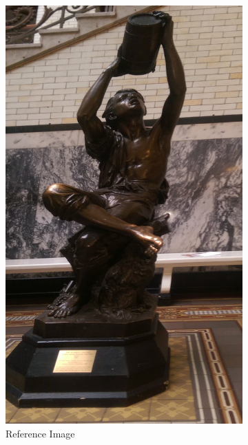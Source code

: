 \documentclass{article}
\begin{document}
\begin{figure}
	\centering
	\begin{subfigure}[b]{0.3\textwidth}
		\centering
		\includegraphics[width=\textwidth]{figures/alignment/waterboy_left}
		\caption{Reference Image}
	\end{subfigure}
	\begin{subfigure}[b]{0.3\textwidth}
		\centering

\end{subfigure}
\end{figure}
\end{document}
